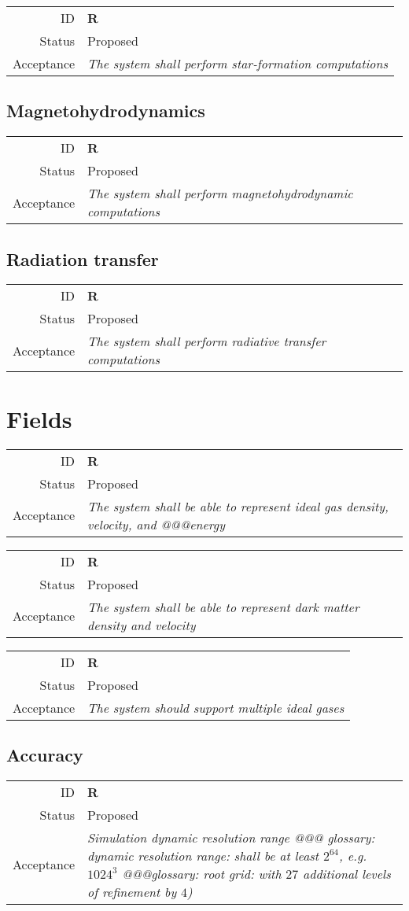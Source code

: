 \documentclass{book}
\newcommand{\req}[3]{
\begin{tabular}{rl}
ID & \textbf{R#1} \\
Status & \textsf{#2} \\
Acceptance & \textit{#3}
\end{tabular}
}
\begin{document}
\req
  {}
  {Proposed}
%
  {The system shall perform star-formation computations}
\subsection{Magnetohydrodynamics}

\req
  {}
  {Proposed}
%
  {The system shall perform magnetohydrodynamic computations}
\subsection{Radiation transfer}

\req
  {}
  {Proposed}
%
  {The system shall perform radiative transfer computations}

\section{Fields}


\req
  {}
  {Proposed}
%
  {The system shall be able to represent ideal gas density, velocity,
  and @@@energy}

\req
  {}
  {Proposed}
%
  {The system shall be able to represent dark matter density and
  velocity}

\req
  {}
  {Proposed}
%
  {The system should support multiple ideal gases}

%
\subsection{Accuracy}

\req
  {}
  {Proposed}
%
  {Simulation dynamic resolution range @@@ glossary: dynamic
  resolution range: shall be at least $2^64$, e.g.~$1024^3$
  @@@glossary: root grid: with $27$ additional levels of refinement by
  $4$)}
\end{document}
